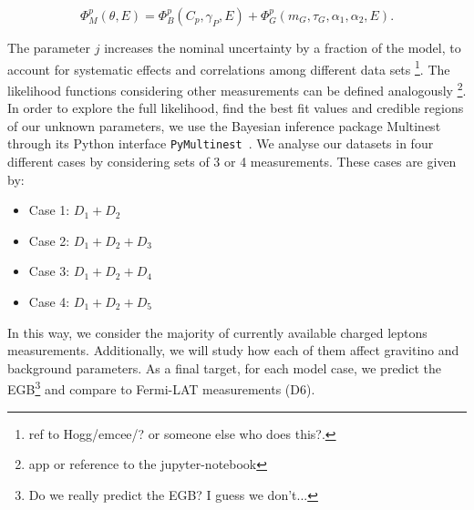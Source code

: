 \documentclass[a4paper,11pt]{article}
\begin{document}
\begin{equation}
\Phi_M^p(\theta,E ) = \Phi_B^p(C_p, \gamma_P, E) + \Phi_{G}^{p}(m_G, \tau_G, \alpha_1, \alpha_2, E).
\end{equation}

The parameter $j$ increases the nominal uncertainty by a fraction of the model, to account for systematic effects and correlations among different data sets \cite{} \footnote{ref to Hogg/emcee/? or someone else who does this?.}. The likelihood functions considering other measurements can be defined analogously \footnote{app or reference to the jupyter-notebook}. In order to explore the full likelihood, find the best fit values and credible regions of our unknown parameters, we use the Bayesian inference package Multinest \cite{Feroz:2008xx} through its Python interface \verb|PyMultinest|~\cite{Buchner:2014nha}. We analyse our datasets in four different cases by considering sets of 3 or 4 measurements. These cases are given by:



\begin{itemize}
\item Case 1: $D_1 + D_2$
\item Case 2: $D_1 + D_2 + D_3$
\item Case 3: $D_1 + D_2 + D_4$
\item Case 4: $D_1 + D_2 + D_5$
\end{itemize}

In this way, we consider the majority of currently available charged leptons measurements. Additionally, we will study how each of them affect gravitino and background parameters. As a final target, for each model case, we predict the EGB\footnote{Do we really predict the EGB? I guess we don't...} and compare to Fermi-LAT measurements (D6).


\end{document}
